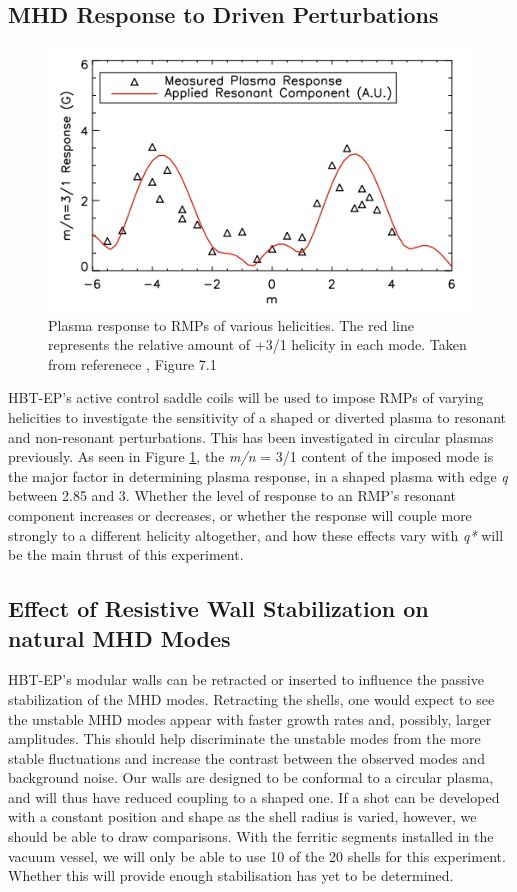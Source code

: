 \documentclass[aps,prl,twocolumn,superscriptaddress,groupedaddress]{revtex4}  %
\begin{document}
	\subsection{MHD Response to Driven Perturbations}
\begin{figure}[b]
	\centering
\includegraphics[scale=.525]{../Plots/Shiraki_thesis_Fig_7_1.png}\caption{Plasma response to RMPs of various helicities.  The red line represents the relative amount of +3/1 helicity in each mode.  Taken from referenece \cite{Shiraki}, Figure 7.1}
	\label{Shiraki_plot}
	\end{figure}
HBT-EP's active control saddle coils will be used to impose RMPs of varying helicities to investigate the sensitivity of a shaped or diverted plasma to resonant and non-resonant perturbations.  This has been investigated in circular plasmas previously\cite{Shiraki}.  As seen in Figure \ref{Shiraki_plot}, the \textit{m/n} = 3/1 content of the imposed mode is the major factor in determining plasma response, in a shaped plasma with edge \textit{q} between 2.85 and 3.  Whether the level of response to an RMP's resonant component increases or decreases, or whether the response will couple more strongly to a different helicity altogether, and how these effects vary with \textit{q*} will be the main thrust of this experiment.\par
	\subsection{Effect of Resistive Wall Stabilization on natural MHD Modes}	 
HBT-EP's modular walls can be retracted or inserted to influence the passive stabilization of the MHD modes.  Retracting the shells, one would expect to see the unstable MHD modes appear with faster growth rates and, possibly, larger amplitudes\cite{Shiraki}.  This should help discriminate the unstable modes from the more stable fluctuations and increase the contrast between the observed modes and background noise.  Our walls are designed to be conformal to a circular plasma, and will thus have reduced coupling to a shaped one. If a shot can be developed with a constant position and shape as the shell radius is varied, however, we should be able to draw comparisons.  With the ferritic segments installed in the vacuum vessel, we will only be able to use 10 of the 20 shells for this experiment.  Whether this will provide enough stabilisation has yet to be determined.\par
\end{document}
